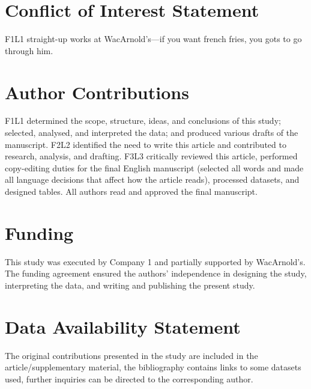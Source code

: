 \documentclass[utf8]{my_class_1_frontiers_vanc}  %
\begin{document}
\section*{Conflict of Interest Statement}

F1L1 straight-up works at WacArnold's---if you want french fries, you gots to go through him.

\section*{Author Contributions}

F1L1 determined the scope, structure, ideas, and conclusions of this study; selected, analysed, and
interpreted the data; and produced various drafts of the manuscript. F2L2 identified the need to
write this article and contributed to research, analysis, and drafting. F3L3 critically reviewed
this article, performed copy-editing duties for the final English manuscript (selected all words
and made all language decisions that affect how the article reads), processed datasets, and
designed tables. All authors read and approved the final manuscript.

\section*{Funding}

This study was executed by Company 1 and partially supported by WacArnold's. 
The funding agreement ensured the authors' independence in designing the study, interpreting the
data, and writing and publishing the present study.



\section*{Data Availability Statement}

The original contributions presented in the study are included in the article/supplementary
material, the bibliography contains links to some datasets used, further inquiries can be directed
to the corresponding author.
\end{document}
